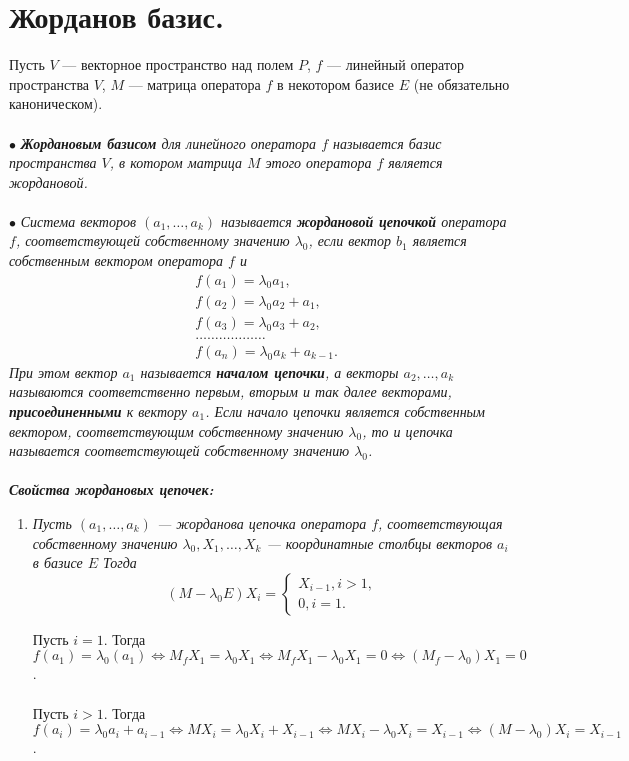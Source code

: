 \section{Жорданов базис.}
Пусть $V$ --- векторное пространство над полем $P$, $f$ --- линейный оператор пространства $V$, $M$ --- матрица оператора $f$ в некотором базисе $E$ (не обязательно каноническом).\\\\
$\bullet$ \textit{\textbf{Жордановым базисом} для линейного оператора $f$ называется базис пространства $V$, в котором матрица $M$ этого оператора $f$ является жордановой.}\\\\
$\bullet$ \textit{Система векторов $(a_1, \dots, a_k)$ называется \textbf{жордановой цепочкой} оператора $f$, соответствующей собственному значению $\lambda_0$, если вектор $b_1$ является собственным вектором оператора $f$ и}\begin{align*}
	&f(a_1) = \lambda_0 a_1,\\
	&f(a_2) = \lambda_0 a_2 + a_1,\\
	&f(a_3) = \lambda_0 a_3 + a_2,\\
	&\dots\dots\dots\dots\dots\dots\\
	&f(a_n) = \lambda_0 a_k + a_{k-1}.
\end{align*}
\textit{При этом вектор $a_1$ называется \textbf{началом цепочки}, а векторы $a_2,\dots,a_k$ называются соответственно первым, вторым и так далее векторами, \textbf{присоединенными} к вектору $a_1$. Если начало цепочки является собственным вектором, соответствующим собственному значению $\lambda_0$, то и цепочка называется соответствующей собственному значению $\lambda_0$.}\\\\
\textit{\textbf{Свойства жордановых цепочек:}}
\begin{enumerate}
	\item \textit{Пусть $(a_1, \dots, a_k)$ --- жорданова цепочка оператора $f$, соответствующая собственному значению $\lambda_0, X_1,\dots,X_k$ --- координатные столбцы векторов $a_i$ в базисе $E$ Тогда}
	$$(M - \lambda_0 E) X_i = \begin{cases}X_{i-1}, i>1,\\0, i = 1. \end{cases}$$
	\begin{Proof}
		Пусть $ i = 1$. Тогда $f(a_1) = \lambda_0 (a_1) \Longleftrightarrow M_f X_1 = \lambda_0 X_1 \Longleftrightarrow M_f X_1 - \lambda_0 X_1 = 0 \Longleftrightarrow (M_f -  \lambda_0) X_1 = 0$. \\\\
		Пусть $ i > 1$. Тогда $f(a_i) = \lambda_0 a_i + a_{i-1} \Longleftrightarrow M X_i = \lambda_0 X_i + X_{i-1} \Longleftrightarrow M X_i - \lambda_0 X_i = X_{i-1} \Longleftrightarrow (M - \lambda_0) X_i = X_{i-1}$.
	\end{Proof}
\end{enumerate}
